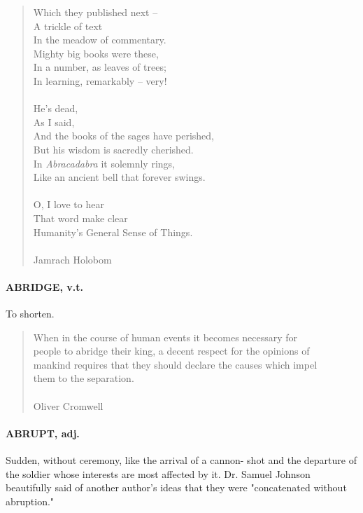 \documentclass[11pt]{article}
\begin{document}
\begin{quote}
          Which they published next -- \\
          A trickle of text \\
  In the meadow of commentary. \\
      Mighty big books were these, \\
      In a number, as leaves of trees; \\
  In learning, remarkably -- very! \\
 \\
          He's dead, \\
          As I said, \\
  And the books of the sages have perished, \\
  But his wisdom is sacredly cherished. \\
  In {\em Abracadabra} it solemnly rings, \\
  Like an ancient bell that forever swings. \\
  \\
  O, I love to hear \\
  That word make clear \\
  Humanity's General Sense of Things. \\
 \\
Jamrach Holobom \end{quote}


\paragraph{ABRIDGE, v.t.}  To shorten.

\begin{quote}       When in the course of human events it becomes necessary for \\
  people to abridge their king, a decent respect for the opinions of \\
  mankind requires that they should declare the causes which impel \\
  them to the separation. \\
 \\
Oliver Cromwell \end{quote}


\paragraph{ABRUPT, adj.}  Sudden, without ceremony, like the arrival of a cannon-
shot and the departure of the soldier whose interests are most
affected by it.  Dr. Samuel Johnson beautifully said of another
author's ideas that they were "concatenated without abruption."
\end{document}
